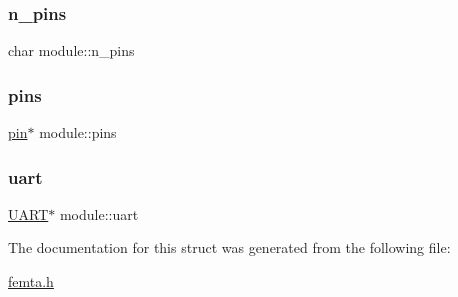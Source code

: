 \mbox{\label{structmodule_a02c9f82d64608b57e23ec9b6d8e40442}} 
\subsubsection{\texorpdfstring{n\+\_\+pins}{n\_pins}}
{\footnotesize\ttfamily char module\+::n\+\_\+pins}

\mbox{\label{structmodule_a3a758f16bbf56b5df5bfb1cfd7515fdb}} 
\subsubsection{\texorpdfstring{pins}{pins}}
{\footnotesize\ttfamily \hyperlink{structpin}{pin}$\ast$ module\+::pins}

\mbox{\label{structmodule_af74c4f29b898b255838d6b18731fa565}} 
\subsubsection{\texorpdfstring{uart}{uart}}
{\footnotesize\ttfamily \hyperlink{femta_8h_a13b3221f36ef9cb93c995303f10fed50}{U\+A\+RT}$\ast$ module\+::uart}



The documentation for this struct was generated from the following file\+:\begin{DoxyCompactItemize}
\item 
\hyperlink{femta_8h}{femta.\+h}\end{DoxyCompactItemize}
